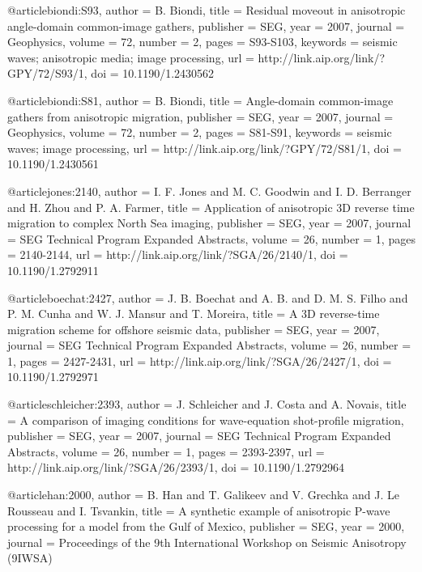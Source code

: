{@article{biondi:S93,
  author =	 {B. Biondi},
  title =	 {Residual moveout in anisotropic angle-domain
                  common-image gathers},
  publisher =	 {SEG},
  year =	 2007,
  journal =	 {Geophysics},
  volume =	 72,
  number =	 2,
  pages =	 {S93-S103},
  keywords =	 {seismic waves; anisotropic media; image processing},
  url =		 {http://link.aip.org/link/?GPY/72/S93/1},
  doi =		 {10.1190/1.2430562}
}

@article{biondi:S81,
  author =	 {B. Biondi},
  title =	 {Angle-domain common-image gathers from anisotropic
                  migration},
  publisher =	 {SEG},
  year =	 2007,
  journal =	 {Geophysics},
  volume =	 72,
  number =	 2,
  pages =	 {S81-S91},
  keywords =	 {seismic waves; image processing},
  url =		 {http://link.aip.org/link/?GPY/72/S81/1},
  doi =		 {10.1190/1.2430561}
}

@article{jones:2140,
  author =	 {I. F. Jones and M. C. Goodwin and I. D. Berranger
                  and H. Zhou and P. A. Farmer},
  title =	 {Application of anisotropic {3D} reverse time
                  migration to complex {N}orth {S}ea imaging},
  publisher =	 {SEG},
  year =	 2007,
  journal =	 {SEG Technical Program Expanded Abstracts},
  volume =	 26,
  number =	 1,
  pages =	 {2140-2144},
  url =		 {http://link.aip.org/link/?SGA/26/2140/1},
  doi =		 {10.1190/1.2792911}
}

@article{boechat:2427,
  author =	 {J. B. Boechat and A. B.
                  and D. M. S. Filho and P. M. Cunha and
                  W. J. Mansur and T. Moreira},
  title =	 {A {3D} reverse-time migration scheme for offshore
                  seismic data},
  publisher =	 {SEG},
  year =	 2007,
  journal =	 {SEG Technical Program Expanded Abstracts},
  volume =	 26,
  number =	 1,
  pages =	 {2427-2431},
  url =		 {http://link.aip.org/link/?SGA/26/2427/1},
  doi =		 {10.1190/1.2792971}
}

@article{schleicher:2393,
  author =	 {J. Schleicher and J. Costa and
                  A. Novais},
  title =	 {A comparison of imaging conditions for wave-equation
                  shot-profile migration},
  publisher =	 {SEG},
  year =	 2007,
  journal =	 {SEG Technical Program Expanded Abstracts},
  volume =	 26,
  number =	 1,
  pages =	 {2393-2397},
  url =		 {http://link.aip.org/link/?SGA/26/2393/1},
  doi =		 {10.1190/1.2792964}
}

@article{han:2000,
  author =	 {B. Han and T. Galikeev and V. Grechka
                  and J. Le Rousseau and I. Tsvankin},
  title =	 {A synthetic example of anisotropic {P}-wave
                  processing for a model from the {G}ulf of {M}exico},
  publisher =	 {SEG},
  year =	 2000,
  journal =	 {Proceedings of the 9th International Workshop on
                  Seismic Anisotropy (9IWSA)}
}

}
